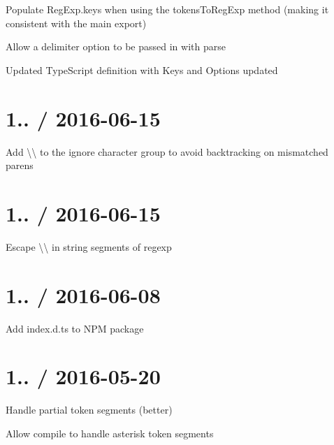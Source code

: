
\begin{DoxyItemize}
\item Populate {\ttfamily Reg\+Exp.\+keys} when using the {\ttfamily tokens\+To\+Reg\+Exp} method (making it consistent with the main export)
\item Allow a {\ttfamily delimiter} option to be passed in with {\ttfamily parse}
\item Updated Type\+Script definition with {\ttfamily Keys} and {\ttfamily Options} updated
\end{DoxyItemize}

\section*{1.. / 2016-\/06-\/15 }


\begin{DoxyItemize}
\item Add {\ttfamily \textbackslash{}\textbackslash{}} to the ignore character group to avoid backtracking on mismatched parens
\end{DoxyItemize}

\section*{1.. / 2016-\/06-\/15 }


\begin{DoxyItemize}
\item Escape {\ttfamily \textbackslash{}\textbackslash{}} in string segments of regexp
\end{DoxyItemize}

\section*{1.. / 2016-\/06-\/08 }


\begin{DoxyItemize}
\item Add {\ttfamily index.\+d.\+ts} to N\+PM package
\end{DoxyItemize}

\section*{1.. / 2016-\/05-\/20 }


\begin{DoxyItemize}
\item Handle partial token segments (better)
\item Allow compile to handle asterisk token segments
\end{DoxyItemize}

